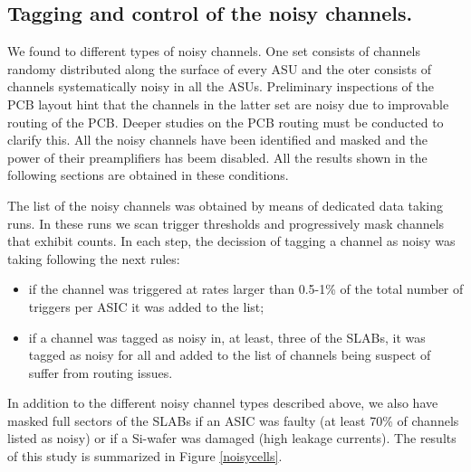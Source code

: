 \documentclass[a4paper,11pt]{article}
\begin{document}
\subsection{Tagging and control of the noisy channels.}
\label{sec:comm_noise}

We found to different types of noisy channels. One set consists of
channels randomy distributed along the surface of every ASU and the oter consists
of channels systematically noisy in all the ASUs. Preliminary inspections of the PCB layout
hint that the channels in the latter set are noisy due to
improvable routing of the PCB.
Deeper studies on the PCB routing must be conducted to clarify this.
All the noisy channels have been identified and masked and the power
of their preamplifiers has beem disabled. All the results shown in the following
sections are obtained in these conditions.

The list of the noisy channels was
obtained by means of dedicated data taking runs. In these runs
we scan trigger thresholds and progressively mask channels that exhibit counts. 
In each step, the decission of tagging a channel as noisy was taking following the next rules:

\begin{itemize}
\item if the channel was triggered at rates larger than 0.5-1\% of the total number of triggers per ASIC it was added to the list;
\item if a channel was tagged as noisy in, at least, three of the SLABs, it was tagged as noisy for all and added to the list of channels being suspect of suffer from routing issues.
\end{itemize}

In addition to the different noisy channel types described above, we also have
masked full sectors of the SLABs if an ASIC was faulty (at least 70\% of channels 
listed as noisy) or if a Si-wafer was damaged (high leakage currents).
The results of this study is summarized in Figure \ref{noisycells}.
\end{document}
